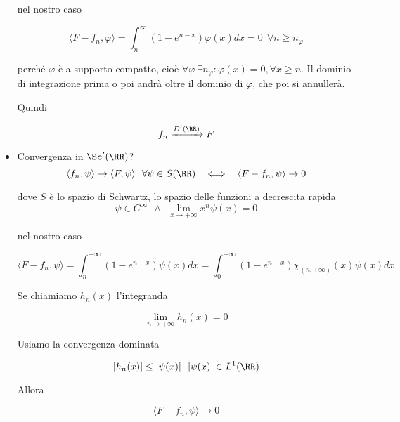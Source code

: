 \begin{itemize}
nel nostro caso

\begin{equation*}
\langle F - f_{n}, \varphi \rangle = \int^{\infty}_{n}\left(1 - e^{n - x}\right) \varphi (x)dx = 0\ \ \forall n \geq n_{\varphi}
\end{equation*}

perché $\varphi $ è a supporto compatto, cioè $\forall \varphi \ \exists n_{\varphi} :\varphi (x) = 0, \forall x \geq n$. Il dominio di integrazione prima o poi andrà oltre il dominio di $\varphi $, che poi si annullerà.

Quindi

\begin{equation*}
f_{n}\xrightarrow{D'(\RR)} F
\end{equation*}
\item Convergenza in $\Sc'(\RR)$?
\begin{equation*}
\langle f_{n}, \psi \rangle \rightarrow \langle F, \psi \rangle \ \ \forall \psi \in S(\RR) \ \ \iff \ \ \langle F - f_{n}, \psi \rangle \rightarrow 0
\end{equation*}

dove $S$ è lo spazio di Schwartz, lo spazio delle funzioni a decrescita rapida
\begin{equation*}
\psi \in C^{\infty} \ \ \land \ \ \lim\limits_{x\rightarrow + \infty} x^{n} \psi (x) = 0
\end{equation*}

nel nostro caso

\begin{equation*}
\langle F - f_{n}, \psi \rangle = \int^{+ \infty}_{n}\left(1 - e^{n - x}\right) \psi (x) dx = \int^{+ \infty}_{0}\left(1 - e^{n - x}\right) \chi_{(n, + \infty)}(x) \psi (x) dx
\end{equation*}

Se chiamiamo $h_{n}(x)$ l'integranda

\begin{equation*}
\lim\limits_{n\rightarrow + \infty} h_{n}(x) = 0
\end{equation*}

Usiamo la convergenza dominata

\begin{equation*}
| h_{n}(x)| \leq | \psi (x)| \ \ | \psi (x)| \in L^{1}(\RR)
\end{equation*}

Allora

\begin{equation*}
\langle F - f_{n}, \psi \rangle \rightarrow 0
\end{equation*}
\end{itemize}

